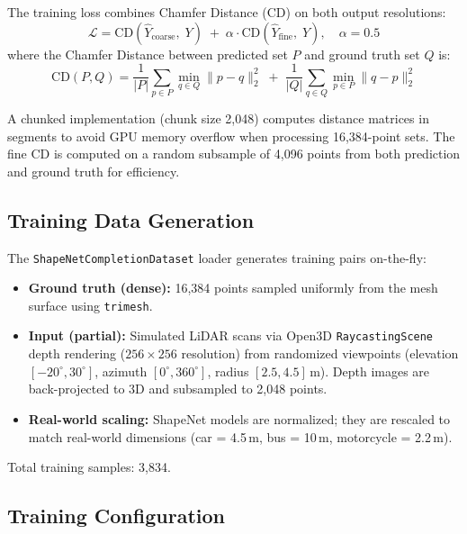 \documentclass[a4paper, 12pt]{article}
\begin{document}
The training loss combines Chamfer Distance (CD) on both output resolutions:
\begin{equation}
    \mathcal{L} = \text{CD}(\hat{Y}_{\text{coarse}},\; Y) \;+\; \alpha \cdot \text{CD}(\hat{Y}_{\text{fine}},\; Y), \quad \alpha = 0.5
\end{equation}
where the Chamfer Distance between predicted set $P$ and ground truth set $Q$ is:
\begin{equation}
    \text{CD}(P, Q) = \frac{1}{|P|} \sum_{p \in P} \min_{q \in Q} \|p - q\|_2^2
    \;+\; \frac{1}{|Q|} \sum_{q \in Q} \min_{p \in P} \|q - p\|_2^2
\end{equation}

A chunked implementation (chunk size 2{,}048) computes distance matrices in segments to avoid GPU memory overflow when processing 16{,}384-point sets. The fine CD is computed on a random subsample of 4{,}096 points from both prediction and ground truth for efficiency.

\subsection{Training Data Generation}

The \texttt{ShapeNetCompletionDataset} loader generates training pairs on-the-fly:

\begin{itemize}[nosep]
    \item \textbf{Ground truth (dense):} 16{,}384 points sampled uniformly from the mesh surface using \texttt{trimesh}.
    \item \textbf{Input (partial):} Simulated LiDAR scans via Open3D \texttt{RaycastingScene} depth rendering ($256 \times 256$ resolution) from randomized viewpoints (elevation $[-20^\circ, 30^\circ]$, azimuth $[0^\circ, 360^\circ]$, radius $[2.5, 4.5]$\,m). Depth images are back-projected to 3D and subsampled to 2{,}048 points.
    \item \textbf{Real-world scaling:} ShapeNet models are normalized; they are rescaled to match real-world dimensions (car = 4.5\,m, bus = 10\,m, motorcycle = 2.2\,m).
\end{itemize}

Total training samples: 3{,}834.

\subsection{Training Configuration}
\end{document}

